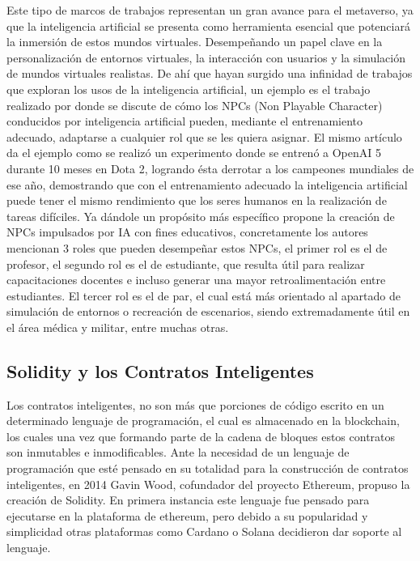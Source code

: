 \documentclass[a4paper,10pt]{article}
\begin{document}
	Este tipo de marcos de trabajos representan un gran avance para el metaverso, ya que la inteligencia artificial se presenta como herramienta esencial que potenciará la inmersión de estos mundos virtuales. Desempeñando un papel clave en la personalización de entornos virtuales, la interacción con usuarios y la simulación de mundos virtuales realistas. De ahí que hayan surgido una infinidad de trabajos que exploran los usos de la inteligencia artificial, un ejemplo es el trabajo realizado por \textcite{yang2022fusing} donde se discute de cómo los NPCs (Non Playable Character) conducidos por inteligencia artificial pueden, mediante el entrenamiento adecuado, adaptarse a cualquier rol que se les quiera asignar. El mismo artículo da el ejemplo como se realizó un experimento donde se entrenó a OpenAI 5 durante 10 meses en Dota 2, logrando ésta derrotar a los campeones mundiales de ese año, demostrando que con el entrenamiento adecuado la inteligencia artificial puede tener el mismo rendimiento que los seres humanos en la realización de tareas difíciles. Ya dándole un propósito más específico \textcite{hwang2022definition} propone la creación de NPCs impulsados por IA con fines educativos, concretamente los autores mencionan 3 roles que pueden desempeñar estos NPCs, el primer rol es el de profesor, el segundo rol es el de estudiante, que resulta útil para realizar capacitaciones docentes e incluso generar una mayor retroalimentación entre estudiantes. El tercer rol es el de par, el cual está más orientado al apartado de simulación de entornos o recreación de escenarios, siendo extremadamente útil en el área médica y militar, entre muchas otras.
	
	\subsection{Solidity y los Contratos Inteligentes}
	\label{seccion2.2}
	Los contratos inteligentes, no son más que porciones de código escrito en un determinado lenguaje de programación, el cual es almacenado en la blockchain, los cuales una vez que formando parte de la cadena de bloques estos contratos son inmutables e inmodificables. Ante la necesidad de un lenguaje de programación que esté pensado en su totalidad para la construcción de contratos inteligentes, en 2014 Gavin Wood, cofundador del proyecto Ethereum, propuso la creación de Solidity. En primera instancia este lenguaje fue pensado para ejecutarse en la plataforma de ethereum, pero debido a su popularidad y simplicidad otras plataformas como Cardano o Solana decidieron dar soporte al lenguaje.
	
\end{document}
